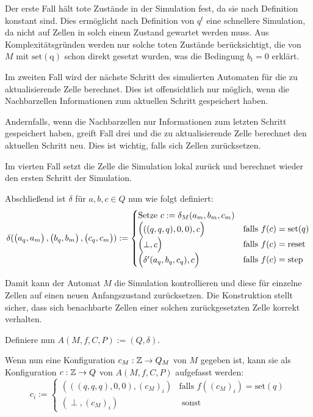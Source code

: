 \begin{definition}
    Der erste Fall hält tote Zustände in der Simulation fest, da sie nach Definition konstant sind. Dies ermöglicht nach Definition von $q^t$ eine schnellere Simulation, da nicht auf Zellen in solch einem Zustand gewartet werden muss. Aus Komplexitätsgründen werden nur solche toten Zustände berücksichtigt, die von $M$ mit $\mathrm{set(q)}$ schon direkt gesetzt wurden, was die Bedingung $b_t = 0$ erklärt.
    
    Im zweiten Fall wird der nächste Schritt des simulierten Automaten für die zu aktualisierende Zelle berechnet.
    Dies ist offensichtlich nur möglich, wenn
    die Nachbarzellen Informationen zum aktuellen Schritt gespeichert haben.
    
    Andernfalls, wenn die Nachbarzellen nur Informationen zum letzten Schritt gespeichert haben,
    greift Fall drei und die zu aktualisierende Zelle berechnet den aktuellen Schritt neu.
    Dies ist wichtig, falls sich Zellen zurücksetzen.
    
    Im vierten Fall setzt die Zelle die Simulation
    lokal zurück und berechnet wieder den ersten Schritt der Simulation.
    
    
    Abschließend ist $\delta$ für $a, b, c \in Q$ nun wie folgt definiert:
    \[
        \delta(\Spvek{a_q, a_m}, \Spvek{b_q, b_m}, \Spvek{c_q, c_m}) := 
        \begin{cases}
            \text{Setze } c := \delta_M(a_m, b_m, c_m) \\
            \Spvek{((q, q, q), 0, 0), c} & \text{falls } f(c) = \mathrm{set}(q) \\
            \Spvek{\perp, c} & \text{falls } f(c) = \mathrm{reset} \\
            \Spvek{\delta'(a_q, b_q, c_q), c} & \text{falls } f(c) = \mathrm{step}
        \end{cases}
    \]
    
    Damit kann der Automat $M$ die Simulation kontrollieren
    und diese für einzelne Zellen auf einen neuen Anfangszustand zurücksetzen. Die Konstruktion stellt sicher,
    dass sich benachbarte Zellen einer solchen zurückgesetzten Zelle
    korrekt verhalten.
    
    Definiere nun $A(M, f, C, P) := (Q, \delta)$.
    
    Wenn nun eine Konfiguration $c_M : \mathbb{Z} \to Q_M$ von $M$
    gegeben ist, kann sie als Konfiguration $c: \mathbb{Z} \to Q$ von $A(M, f, C, P)$
    aufgefasst werden:
    \[
        c_i :=
        \begin{cases}
            (((q, q, q), 0, 0), (c_M)_i) & \text{falls } f((c_M)_i) = \mathrm{set}(q) \\
            (\perp, (c_M)_i) & \text{ sonst}
        \end{cases}
    \]
\end{definition}

